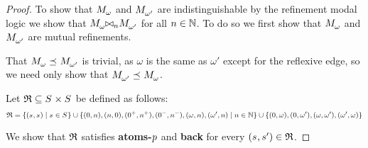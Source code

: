 \begin{proof}
To show that $\kPModel{\omega}$ and $\kPModel{\omega'}$ are indistinguishable by the refinement modal logic we show that $\kPModel{\omega} \bisimref[n] \kPModel{\omega'}$ for all $n \in \mathbb{N}$. To do so we first show that $\kPModel{\omega}$ and $\kPModel{\omega'}$ are mutual refinements.

That $\kPModel{\omega} \refines \kPModel{\omega'}$ is trivial, as $\omega$ is the same as $\omega'$ except for the reflexive edge, so we need only show that $\kPModel{\omega'} \refines \kPModel{\omega}$.

Let $\refinement \subseteq \kStates \times \kStates$ be defined as follows:
$$
\refinement = \{(\kStateS, \kStateS) \mid \kStateS \in \kStates\} \cup
\{(0, n), (n, 0), (0^+, n^+), (0^-, n^-), (\omega, n), (\omega', n) \mid n \in \naturals\} \cup
\{(0, \omega), (0, \omega'), (\omega, \omega'), (\omega', \omega)\}
$$

We show that $\mathfrak{R}$ satisfies {\bf atoms-$p$} and {\bf back} for every $(\kStateS, \kStateSP) \in \refinement$.


\end{proof}
